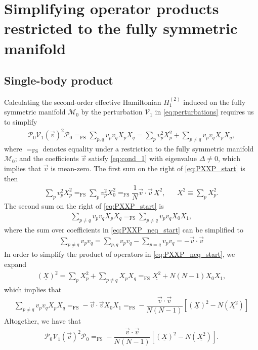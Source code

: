\documentclass[nofootinbib,notitlepage,11pt]{revtex4-2}
\newcommand{\f}[2]{\dfrac{#1}{#2}} %
\newcommand{\p}[1]{\left(#1\right)} %
\renewcommand{\sp}[1]{\left[#1\right]} %
\renewcommand{\c}{\cdot} %
\renewcommand{\v}{\vec} %
\newcommand{\1}{\mathds{1}}
\newcommand{\M}{\mathcal{M}}
\renewcommand{\P}{\mathcal{P}}
\newcommand{\V}{\mathcal{V}}
\newcommand{\EQFS}{=_{\text{FS}}}
\newcommand{\col}{\underline}
\begin{document}
\section{Simplifying operator products restricted to the fully
  symmetric manifold}
\label{sec:sym_prod}

\subsection{Single-body product}
\label{sec:PXXP}

Calculating the second-order effective Hamiltonian $H_1^{(2)}$ induced
on the fully symmetric manifold $\M_0$ by the perturbation $\V_1$ in
\eqref{eq:perturbations} requires us to simplify
\begin{align}
  \P_0 \V_1\p{\v v}^2 \P_0
  \EQFS \sum_{p,q} v_p v_q X_p X_q
  = \sum_p v_p^2 X_p^2
  + \sum_{p\ne q} v_p v_q X_p X_q,
  \label{eq:PXXP_start}
\end{align}
where $\EQFS$ denotes equality under a restriction to the fully
symmetric manifold $\M_0$; and the coefficients $\v v$ satisfy
\eqref{eq:cond_1} with eigenvalue $\Delta\ne0$, which implies that
$\v v$ is mean-zero.  The first sum on the right of
\eqref{eq:PXXP_start} is then
\begin{align}
  \sum_p v_p^2 X_p^2
  \EQFS \sum_p v_p^2 X_0^2
  \EQFS \f1N \v v\c\v v\, \col{X^2},
  &&
  \col{X^2} \equiv \sum_p X_p^2.
  \label{eq:PXXP_eq}
\end{align}
The second sum on the right of \eqref{eq:PXXP_start} is
\begin{align}
  \sum_{p\ne q} v_p v_q X_p X_q
  \EQFS \sum_{p\ne q} v_p v_q X_0 X_1,
  \label{eq:PXXP_neq_start}
\end{align}
where the sum over coefficients in \eqref{eq:PXXP_neq_start} can be
simplified to
\begin{align}
  \sum_{p\ne q} v_p v_q
  = \sum_{p,q} v_p v_q - \sum_{p=q} v_p v_q
  = - \v v\c\v v
\end{align}
In order to simplify the product of operators in
\eqref{eq:PXXP_neq_start}, we expand
\begin{align}
  \p{\col{X}}^2
  = \sum_p X_p^2 + \sum_{p\ne q} X_p X_q
  \EQFS \col{X^2} + N \p{N-1} X_0 X_1,
  \label{eq:PXXP_neq_ops}
\end{align}
which implies that
\begin{align}
  \sum_{p\ne q} v_p v_q X_p X_q
  \EQFS - \v v\c\v v X_0 X_1
  \EQFS -\f{\v v\c\v v}{N\p{N-1}}
  \sp{\p{\col{X}}^2 - N \p{\col{X^2}}}
  \label{eq:PXXP_neq}
\end{align}
Altogether, we have that
\begin{align}
  \P_0 \V_1\p{\v v}^2 \P_0
  \EQFS -\f{\v v\c\v v}{N\p{N-1}}
  \sp{\p{\col{X}}^2 - N \p{\col{X^2}}}.
\end{align}
\end{document}
